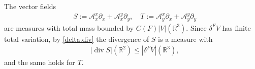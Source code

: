 \documentclass[11pt,a4paper]{amsart}
\newcommand{\R}{\mathbb{R}}
\newcommand{\de}{\partial}
\newcommand{\nin}{\not\in}
\theoremstyle{definition}
\newtheorem{rmk}[definition]{Remark}
\DeclareMathOperator{\dive}{div}
\newcommand{\A}{\mathcal{A}}
\begin{document}

The vector fields
\begin{align*}
	&S:=\A_x^x\de_x+\A_x^y\de_y,\quad T:=\A_y^x\de_x+\A_y^y\de_y
\end{align*}
are measures with total mass bounded by $C(F)|V|(\R^3)$.
Since $\delta^F V$ has finite total variation, by \cref{delta.div} the divergence of $S$ is a measure with
\begin{align*}
	&\lvert \dive S\rvert(\R^2)\le|\delta^F V|(\R^3),
\end{align*}
and the same holds for $T$.
\end{document}
